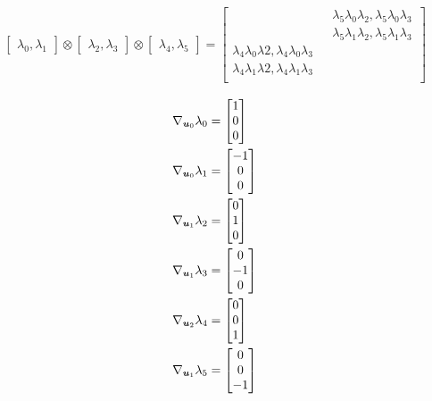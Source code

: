 \documentclass{article}
\begin{document}
\begin{align*}
     \begin{bmatrix}
       \lambda_0 , \lambda_1 
    \end{bmatrix}
  	\otimes
    \begin{bmatrix}
        \lambda_2 , \lambda_3
    \end{bmatrix}
    \otimes
    \begin{bmatrix}
        \lambda_4 , \lambda_5
    \end{bmatrix}
    =
    \begin{bmatrix}
        \qquad \qquad \qquad \qquad  \lambda_5\lambda_0\lambda_2 , \lambda_5\lambda_0\lambda_3 \\ 
        \qquad \qquad \qquad \qquad  \lambda_5\lambda_1\lambda_2 ,  \lambda_5\lambda_1\lambda_3 \\   
        \lambda_4\lambda_0\lambda2 , \lambda_4\lambda_0\lambda_3 \qquad \qquad \qquad \qquad \\
         \lambda_4\lambda_1\lambda2 , \lambda_4\lambda_1\lambda_3 \qquad \qquad \qquad \qquad \\
    \end{bmatrix}
\end{align*}

\begin{align*}
    \nabla_{{\boldsymbol u}_0} \lambda_0 &= \begin{bmatrix}
        1 \\ 0 \\ 0
    \end{bmatrix}\\
    \nabla_{{\boldsymbol u}_0} \lambda_1 &= \begin{bmatrix}
        -1 \\ 0 \\ 0 
    \end{bmatrix}\\
    \nabla_{{\boldsymbol u}_1} \lambda_2 &= \begin{bmatrix}
        0 \\ 1 \\0 
    \end{bmatrix} \\
     \nabla_{{\boldsymbol u}_1} \lambda_3 &= \begin{bmatrix}
        0 \\ -1 \\ 0
    \end{bmatrix}\\
     \nabla_{{\boldsymbol u}_2} \lambda_4 &= \begin{bmatrix}
        0 \\ 0 \\ 1 
    \end{bmatrix} \\
     \nabla_{{\boldsymbol u}_1} \lambda_5 &= \begin{bmatrix}
        0 \\ 0 \\ -1
    \end{bmatrix}
\end{align*}
\end{document}
